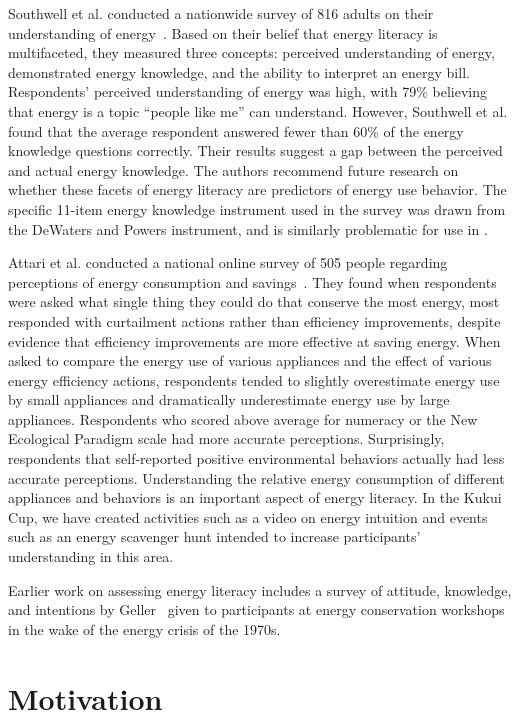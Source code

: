 Southwell et al. conducted a nationwide survey of 816 adults on their understanding of energy~\cite{Southwell2012}. Based on their belief that energy literacy is multifaceted, they measured three concepts: perceived understanding of energy, demonstrated energy knowledge, and the ability to interpret an energy bill. Respondents' perceived understanding of energy was high, with 79\% believing that energy is a topic ``people like me'' can understand. However, Southwell et al. found that the average respondent answered fewer than 60\% of the energy knowledge questions correctly. Their results suggest a gap between the perceived and actual energy knowledge. The authors recommend future research on whether these facets of energy literacy are predictors of energy use behavior. The specific 11-item energy knowledge instrument used in the survey was drawn from the DeWaters and Powers instrument, and is similarly problematic for use in \Hawaii.

Attari et al. conducted a national online survey of 505 people regarding perceptions of energy consumption and savings~\cite{Attari2010}. They found when respondents were asked what single thing they could do that conserve the most energy, most responded with curtailment actions rather than efficiency improvements, despite evidence that efficiency improvements are more effective at saving energy. When asked to compare the energy use of various appliances and the effect of various energy efficiency actions, respondents tended to slightly overestimate energy use by small appliances and dramatically underestimate energy use by large appliances. Respondents who scored above average for numeracy or the New Ecological Paradigm scale had more accurate perceptions. Surprisingly, respondents that self-reported positive environmental behaviors actually had less accurate perceptions. Understanding the relative energy consumption of different appliances and behaviors is an important aspect of energy literacy. In the Kukui Cup, we have created activities such as a video on energy intuition and events such as an energy scavenger hunt intended to increase participants' understanding in this area.

Earlier work on assessing energy literacy includes a survey of attitude, knowledge, and intentions by Geller~\cite{Geller81} given to participants at energy conservation workshops in the wake of the energy crisis of the 1970s.


\section{Motivation}

